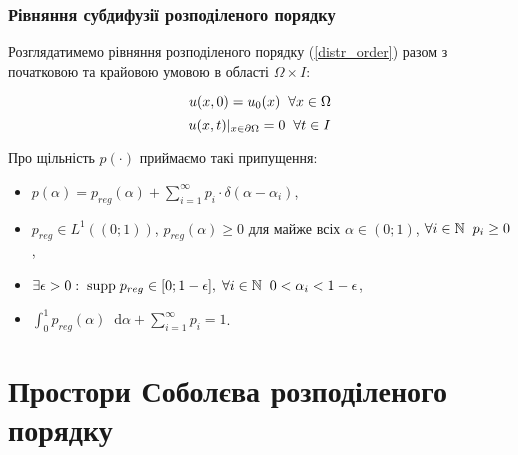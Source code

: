 \documentclass[ukrainian]{beamer}
\newcommand{\NN}{\mathbb{N}}
\newcommand*\diff{\mathop{}\!\mathrm{d}}
\begin{document}
\begin{frame}

\frametitle{Рівняння субдифузії розподіленого порядку}

Розглядатимемо рівняння розподіленого порядку (\ref{distr_order}) разом з початковою та крайовою умовою в області $\Omega\times{I}$:

\begin{equation}\label{initial}
u(x,0)=u_0(x)\hspace{2mm}\forall{x}\in{\Omega}
\end{equation}
\begin{equation}\label{boundary}
u(x,t)|_{x\in\partial\Omega}=0\hspace{2mm}\forall{t}\in{I}
\end{equation}

Про щільність $p(\cdot)$ приймаємо такі припущення:

\begin{itemize}
	
	\vspace{1mm}
	\item $p(\alpha)=p_{reg}(\alpha)+\sum_{i=1}^\infty{p_i}\cdot\delta(\alpha-\alpha_i)$,\smallskip

	\vspace{1mm}
	\item $p_{reg}\in{L^1((0;1))}$, $p_{reg}(\alpha)\geq0$ для майже всіх $\alpha\in(0;1)$, $\forall i\in\NN\hspace{2mm} p_i\geq0$,\smallskip

	\vspace{1mm}
	\item $\exists \epsilon>0:\hspace{1mm}\mathrm{supp}\hspace{1mm}p_{reg}\in[0;1-\epsilon],\hspace{1mm}\forall{i}\in\NN\hspace{2mm}0<\alpha_i<1-\epsilon$,\smallskip

	\vspace{1mm}
	\item $\int_0^1p_{reg}(\alpha)\diff{\alpha}+\sum_{i=1}^\infty{p_i}=1$.\smallskip

	\vspace{1mm}
\end{itemize}

\end{frame}

\section{Простори Соболєва розподіленого порядку}
\end{document}
